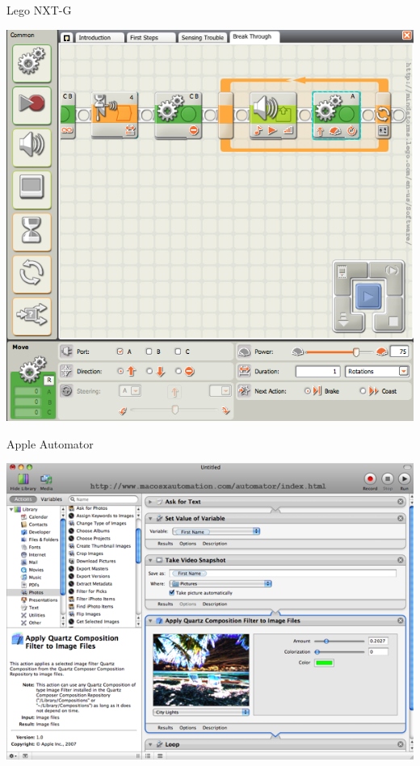 \documentclass[handout]{beamer}
\begin{document}

\begin{frame}{Lego NXT-G}

\includegraphics[height=.8\textheight]{lego}

\end{frame}


\begin{frame}{Apple Automator}

\includegraphics[height=.8\textheight]{automator}

\end{frame}
\end{document}
